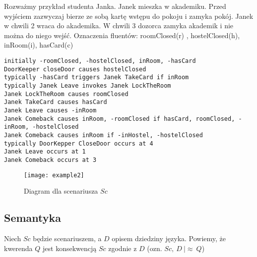 \begin{example}
Rozważmy przykład studenta Janka. Janek mieszka w akademiku. 
Przed wyjściem zazwyczaj bierze ze sobą kartę wstępu do pokoju i zamyka pokój. 
Janek w chwili 2 wraca do akademika. W chwili 3 dozorca zamyka akademik i nie można do niego wejść. 
Oznaczenia fluentów: roomClosed(r) , hostelClosed(h), inRoom(i), hasCard(c)

	\begin{lstlisting}
initially -roomClosed, -hostelClosed, inRoom, -hasCard
DoorKeeper closeDoor causes hostelClosed
typically -hasCard triggers Janek TakeCard if inRoom
typically Janek Leave invokes Janek LockTheRoom
Janek LockTheRoom causes roomClosed
Janek TakeCard causes hasCard
Janek Leave causes -inRoom
Janek Comeback causes inRoom, -roomClosed if hasCard, roomClosed, -inRoom, -hostelClosed
Janek Comeback causes inRoom if -inHostel, -hostelClosed
typically DoorKepper CloseDoor occurs at 4
Janek Leave occurs at 1
Janek Comeback occurs at 3
	\end{lstlisting}

\begin{figure}[h!]
	\centering
	\texttt{[image: example2]}
	\caption{Diagram dla scenariusza $Sc$}
	\label{PicSC5}
\end{figure}
\end{example}

\subsection{Semantyka}
Niech $Sc$ będzie scenariuszem, a $D$ opisem dziedziny języka. Powiemy, że kwerenda $Q$ jest konsekwencją
$Sc$ zgodnie z $D$ (ozn. $Sc,\ D\ |\approx\ Q $)

